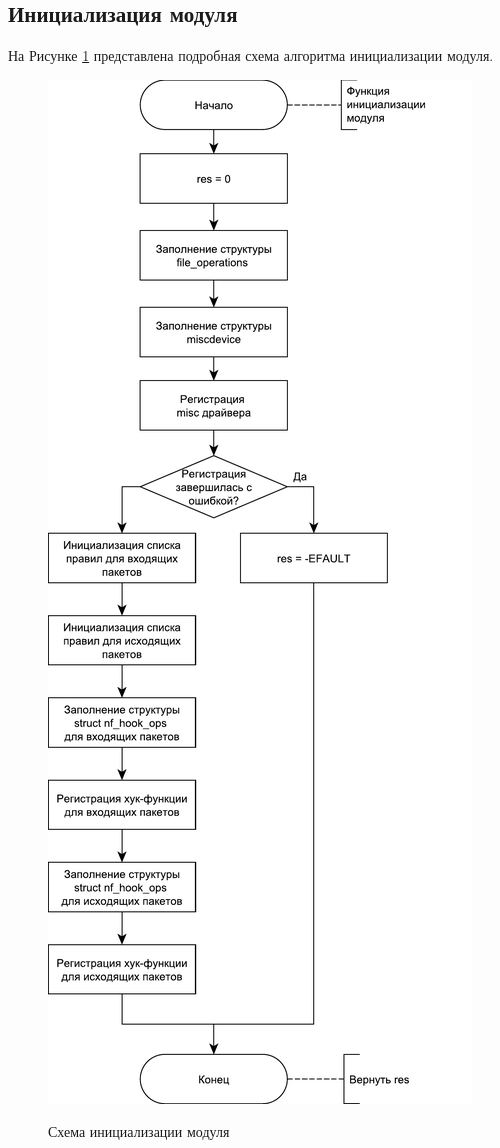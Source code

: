 \subsection{Инициализация модуля}
На Рисунке \ref{fig3:image} представлена подробная схема алгоритма инициализации модуля.
\begin{figure}[p]
	\begin{center}
		{\includegraphics[scale = 0.6]{img/init.pdf}}
		\caption{Схема инициализации модуля}
		\label{fig3:image}
	\end{center}
\end{figure}

